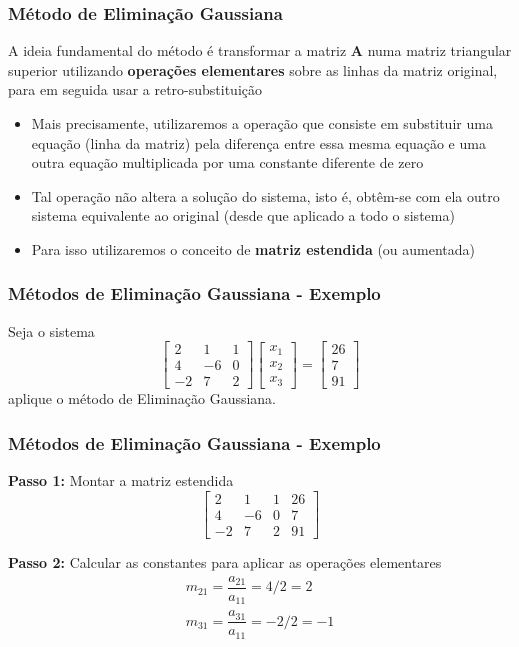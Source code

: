 \documentclass{beamer}
\theoremstyle{mystyle}
\begin{document}
\begin{frame}
	\frametitle{Método de Eliminação Gaussiana}
	 A ideia fundamental do método é transformar a matriz \textbf{A} numa matriz triangular superior utilizando \textbf{operações elementares} sobre as linhas da matriz original, para em seguida usar a retro-substituição
	\begin{itemize}
		\item Mais precisamente, utilizaremos a operação que consiste em substituir uma equação (linha da matriz) pela diferença entre essa mesma equação e uma outra equação multiplicada por uma \alert{constante} diferente de zero
		\item Tal operação não altera a solução do sistema, isto é, obtêm-se com ela outro sistema equivalente ao original (desde que aplicado a todo o sistema)
		\item Para isso utilizaremos o conceito de \textbf{matriz estendida} (ou aumentada)
	\end{itemize}
\end{frame}

\begin{frame}
	\frametitle{Métodos de Eliminação Gaussiana - Exemplo}
	 Seja o sistema
	 \begin{equation*}
	 	\left[
	 	\begin{array}{ccc}
	 		2 & 1 & 1  \\
	 		4 & -6 & 0  \\
	 		-2 & 7 & 2
	 	\end{array}
	 	\right] 
	 	\begin{bmatrix} x_{1} \\ x_{2} \\ x_{3} \end{bmatrix}
	 	=
	 	\begin{bmatrix} 26 \\ 7 \\ 91 \end{bmatrix}
	\end{equation*}
	aplique o método de Eliminação Gaussiana.

\end{frame}

\begin{frame}
	\frametitle{Métodos de Eliminação Gaussiana - Exemplo}
	\textbf{Passo 1:} Montar a matriz estendida
	\begin{equation*}
		\left[
		\begin{array}{ccc|c}
			2  & 1  & 1 & 26 \\
			4  & -6 & 0 & 7  \\
			-2 & 7  & 2 & 91
		\end{array}
		\right]
	\end{equation*}

	\textbf{Passo 2:} Calcular as \alert{constantes} para aplicar as operações elementares
	\begin{gather*}
		m_{21} = \dfrac{a_{21}}{a_{11}} = 4/2 = 2\\
		m_{31} = \dfrac{a_{31}}{a_{11}} = -2/2 = -1
	\end{gather*}
\end{frame}
\end{document}
